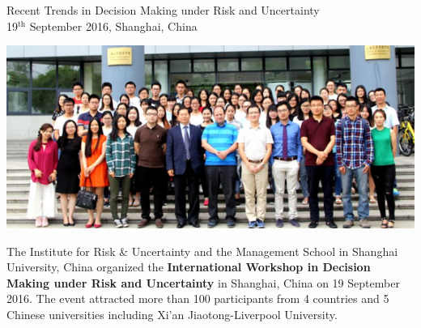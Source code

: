 \documentclass[11pt]{article}%
\begin{document}
\cleardoublepage

\thispagestyle{Training}
\begin{minipage}{1.\textwidth}
\vspace{20pt}
{\LARGE {Recent Trends in Decision Making under Risk and Uncertainty}}\\
{\large 19$^{\text{th}}$ September 2016, Shanghai, China}

\includegraphics[width=1\linewidth]{training/PictureThanasi2_crop.png}

The Institute for Risk & Uncertainty and the Management School in Shanghai University, China organized the {\bf International Workshop in Decision Making under Risk and Uncertainty} in Shanghai, China on 19 September 2016.
The event attracted more than 100 participants from 4 countries and 5 Chinese universities including Xi’an Jiaotong-Liverpool University.  

\begin{multicols}{2}



\end{multicols}
\end{minipage}
\end{document}
